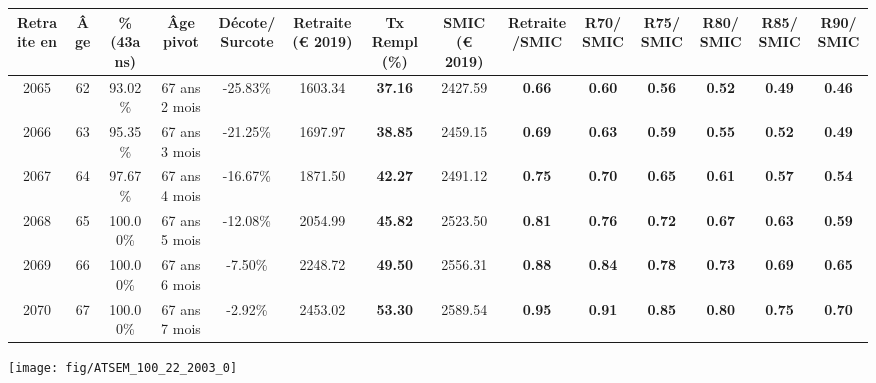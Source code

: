 \begin{adjustbox}{max width=\textwidth} 
\begin{tabular}[htb]{|c|c||c|c|c||c|c||c|c||c|c|c|c|c|} 
\hline 
 Retraite en &  Âge &  \%(43ans) &  Âge pivot &  Décote/Surcote &  Retraite (\euro{} 2019) &  Tx Rempl(\%) &  SMIC (\euro{} 2019) &  Retraite/SMIC &  R70/SMIC &  R75/SMIC &  R80/SMIC &  R85/SMIC &  R90/SMIC \\ 
\hline \hline 
 2065 &  62 &  93.02\% &  67 ans 2 mois &  -25.83\% &  1603.34 &  {\bf 37.16} &  2427.59 &  {\bf {\color{red} 0.66}} &  {\bf {\color{red} 0.60}} &  {\bf {\color{red} 0.56}} &  {\bf {\color{red} 0.52}} &  {\bf {\color{red} 0.49}} &  {\bf {\color{red} 0.46}} \\ 
\hline 
 2066 &  63 &  95.35\% &  67 ans 3 mois &  -21.25\% &  1697.97 &  {\bf 38.85} &  2459.15 &  {\bf {\color{red} 0.69}} &  {\bf {\color{red} 0.63}} &  {\bf {\color{red} 0.59}} &  {\bf {\color{red} 0.55}} &  {\bf {\color{red} 0.52}} &  {\bf {\color{red} 0.49}} \\ 
\hline 
 2067 &  64 &  97.67\% &  67 ans 4 mois &  -16.67\% &  1871.50 &  {\bf 42.27} &  2491.12 &  {\bf {\color{red} 0.75}} &  {\bf {\color{red} 0.70}} &  {\bf {\color{red} 0.65}} &  {\bf {\color{red} 0.61}} &  {\bf {\color{red} 0.57}} &  {\bf {\color{red} 0.54}} \\ 
\hline 
 2068 &  65 &  100.00\% &  67 ans 5 mois &  -12.08\% &  2054.99 &  {\bf 45.82} &  2523.50 &  {\bf {\color{red} 0.81}} &  {\bf {\color{red} 0.76}} &  {\bf {\color{red} 0.72}} &  {\bf {\color{red} 0.67}} &  {\bf {\color{red} 0.63}} &  {\bf {\color{red} 0.59}} \\ 
\hline 
 2069 &  66 &  100.00\% &  67 ans 6 mois &  -7.50\% &  2248.72 &  {\bf 49.50} &  2556.31 &  {\bf {\color{red} 0.88}} &  {\bf {\color{red} 0.84}} &  {\bf {\color{red} 0.78}} &  {\bf {\color{red} 0.73}} &  {\bf {\color{red} 0.69}} &  {\bf {\color{red} 0.65}} \\ 
\hline 
 2070 &  67 &  100.00\% &  67 ans 7 mois &  -2.92\% &  2453.02 &  {\bf 53.30} &  2589.54 &  {\bf {\color{red} 0.95}} &  {\bf {\color{red} 0.91}} &  {\bf {\color{red} 0.85}} &  {\bf {\color{red} 0.80}} &  {\bf {\color{red} 0.75}} &  {\bf {\color{red} 0.70}} \\ 
\hline 
\hline 
\end{tabular} 
\end{adjustbox} 
 
 \vspace{0.1cm} 

 {\hspace{-2.2cm}\texttt{[image: fig/ATSEM\_100\_22\_2003\_0]}} 

